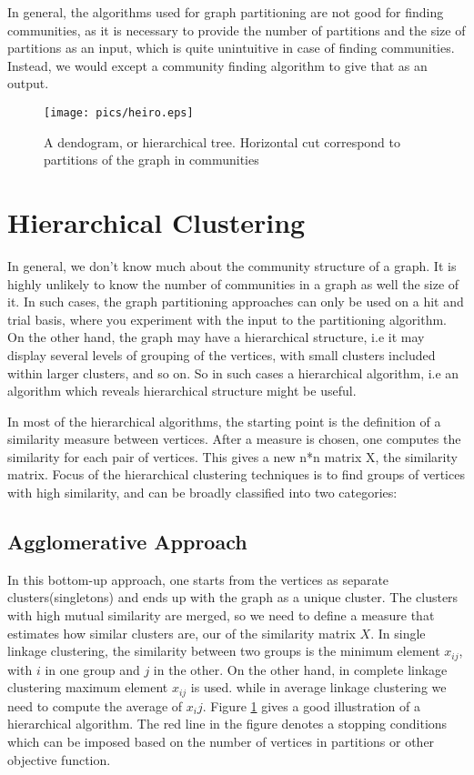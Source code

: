 \documentclass[letterpaper]{article}
\begin{document}
In general, the algorithms used for graph partitioning are not good for finding
communities, as it is necessary to provide the number of partitions and the
size of partitions as an input, which is quite unintuitive in case of finding
communities. Instead, we would except a community finding algorithm to give
that as an output.  



\begin{figure}
\texttt{[image: pics/heiro.eps]}
\caption{A dendogram, or hierarchical tree. Horizontal cut correspond to
partitions of the graph in communities} \label{fig:heiro}
\end{figure}
\section{Hierarchical Clustering} In general, we don't know much about the
community structure of a graph. It is highly unlikely to know the number of
communities in a graph as well the size of it. In such cases, the graph
partitioning approaches can only be used on a hit and trial basis, where you
experiment with the input to the partitioning algorithm. On the other hand, the
graph may have a hierarchical structure, i.e it may display several levels of
grouping of the vertices, with small clusters included within larger clusters,
and so on. So in such cases a hierarchical algorithm, i.e an algorithm which
reveals hierarchical structure might be useful. 

In most of the hierarchical algorithms, the starting point is the definition of
a similarity measure between vertices. After a measure is chosen, one computes
the similarity for each pair of vertices.  This gives a new n*n matrix X, the
similarity matrix. Focus of the hierarchical clustering techniques is to find
groups of vertices with high similarity, and can be broadly classified into two
categories:

\subsection{Agglomerative Approach}
In this bottom-up approach, one starts from the vertices as separate
clusters(singletons) and ends up with the graph as a unique cluster. The
clusters with high mutual similarity are merged, so we need to define a measure
that estimates how similar clusters are, our of the similarity matrix $X$. In
single linkage clustering, the similarity between two groups is the minimum
element $x_{ij}$, with $i$ in one group and $j$ in the other. On the other
hand, in complete linkage clustering maximum element $x_{ij}$ is used. while in
average linkage clustering we need to compute the average of $x_ij$.
Figure \ref{fig:heiro} gives a good illustration of a hierarchical algorithm. The red
line in the figure denotes a stopping conditions which can be imposed based on
the number of vertices in partitions or other objective function. 
\end{document}
